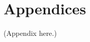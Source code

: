 \appendix
\section*{Appendices}

\setcounter{equation}{0}
\renewcommand{\theequation}{\Alph{subsection}.\arabic{equation}}%
\renewcommand{\thesubsection}{\Alph{subsection}}%

% 
(Appendix here.)
